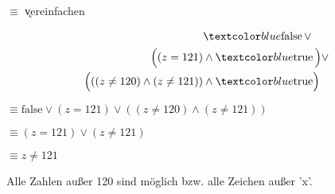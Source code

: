 \documentclass{bschlangaul-aufgabe}
\begin{document}
\begin{bAntwort}
$\equiv$ \k{vereinfachen}

\begin{align*}
& \m{\text{false}} \, \lor\\
\Bigl( (z = 121) & \land \m{\text{true}} \, \Bigr) \lor \\
\Bigl( ((z \neq 120) \land (z \neq 121)) & \land  \m{\text{true}} \Bigr) \\
\end{align*}

$\equiv \text{false} \lor (z = 121) \lor ((z \neq 120) \land (z \neq 121))$

$\equiv (z = 121) \lor (z \neq 121)$

$\equiv z \neq 121$

Alle Zahlen außer 120 sind möglich bzw. alle Zeichen außer ’x’.
\end{bAntwort}
\end{document}
